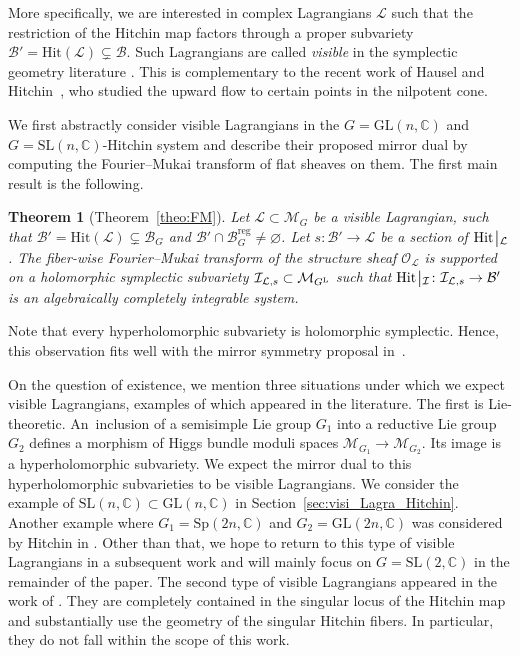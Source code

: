 \documentclass[pdftex]{sigma}
\numberwithin{equation}{section}
\newtheorem{theo}{Theorem}[section]
\theoremstyle{definition}
\newcommand{\reg}{\mathrm{reg}}
\newcommand{\rest}{\: \rule[-3.5pt]{0.5pt}{11.5pt}\,{}}
\renewcommand{\to}{\rightarrow}
\newcommand{\calB}{\mathcal{B}}
\newcommand{\calI}{\mathcal{I}}
\newcommand{\calL}{\mathcal{L}}
\newcommand{\calM}{\mathcal{M}}
\newcommand{\calO}{\mathcal{O}}
\newcommand{\CC}{\mathbb{C}}
\newcommand{\Hit}{\mathrm{Hit}}
\newcommand{\GL}{\mathrm{GL}}
\newcommand{\SL}{\mathrm{SL}}
\newcommand{\Sp}{\mathrm{Sp}}
\begin{document}
More specifically, we are interested in complex Lagrangians $\calL$ such that the restriction of the Hitchin map factors through a proper subvariety $\calB'=\Hit(\calL)\subsetneq \calB$. Such Lagrangians are called \textit{visible} in the symplectic geometry literature \cite{visible}. This is complementary to the recent work of Hausel and Hitchin~\cite{HauselHitchin}, who studied the upward flow to certain points in the nilpotent cone.

We first abstractly consider visible Lagrangians in the $G=\GL(n,\CC)$ and $G=\SL(n,\CC)$-Hitchin system and describe their proposed mirror dual by computing the Fourier--Mukai transform of flat sheaves on them. The first main result is the following.

\begin{theo}[{Theorem~\ref{theo:FM}}]\label{theo:1}
 Let $\calL \subset \calM_G$ be a visible Lagrangian, such that $\calB'=\Hit(\calL) \subsetneq \calB_G$ and $\calB' \cap \calB^\reg_G \neq \varnothing$. Let $s\colon \calB' \to \calL$ be a section of $\Hit\rest_{\calL}$. The fiber-wise Fourier--Mukai transform of the structure sheaf $\calO_\calL$ is supported on a holomorphic symplectic subvariety $\calI_{\calL,s} \subset \calM_{G^{\rm L}}$ such that $\Hit\rest_{\calI}\colon \calI_{\calL,s} \to \calB'$ is an algebraically completely integrable system.
\end{theo}

Note that every hyperholomorphic subvariety is holomorphic symplectic. Hence, this observation fits well with the mirror symmetry proposal in~\cite{KapustinWitten}.

On the question of existence, we mention three situations under which we expect visible Lagrangians, examples of which appeared in the literature. The first is Lie-theoretic. An~inclusion of a semisimple Lie group $G_1$ into a reductive Lie group $G_2$ defines a morphism of Higgs bundle moduli spaces $\calM_{G_1} \to \calM_{G_2}$. Its image is a hyperholomorphic subvariety. We expect the mirror dual to this hyperholomorphic subvarieties to be visible Lagrangians. We consider the example of $\SL(n,\CC) \subset \GL(n,\CC)$ in Section~\ref{sec:visi_Lagra_Hitchin}. Another example where $G_1=\Sp(2n,\CC)$ and $G_2=\GL(2n,\CC)$ was considered by Hitchin in \cite{HitchinSpUmm}. Other than that, we hope to return to this type of visible Lagrangians in a subsequent work and will mainly focus on $G=\SL(2,\CC)$ in the remainder of the paper.
The second type of visible Lagrangians appeared in the work of \cite{FGOP, FHHO, FrancoPeon}. They are completely contained in the singular locus of the Hitchin map and substantially use the geometry of the singular Hitchin fibers. In particular, they do not fall within the scope of this work.
\end{document}
